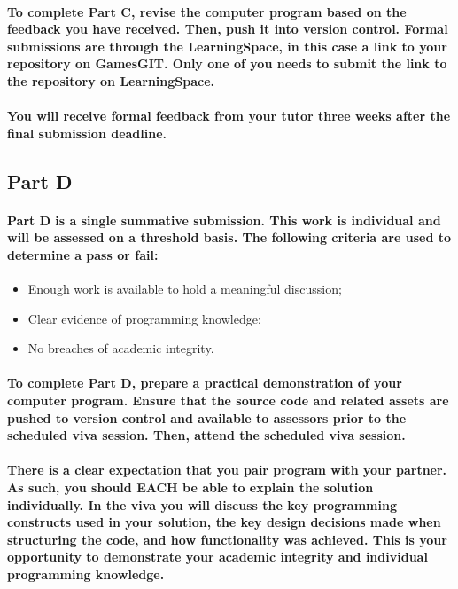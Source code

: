\documentclass{../../fal_assignment}
\begin{document}
\paragraph{To complete Part C, revise the computer program based on the feedback you have received. Then, push it into version control. Formal submissions are through the LearningSpace, in this case a link to your repository on GamesGIT. Only one of you needs to submit the link to the repository on LearningSpace.}

\paragraph{You will receive \textbf{formal feedback} from your \textbf{tutor} three weeks after the final submission deadline.}

\subsection*{Part D}

\paragraph{Part D is a \textbf{single summative submission}. This work is \textbf{individual} and will be assessed on a \textbf{threshold} basis.  The following criteria are used to determine a pass or fail:}

\begin{itemize}
	\item Enough work is available to hold a meaningful discussion;
	\item Clear evidence of programming knowledge;
	\item No breaches of academic integrity.
\end{itemize}

\paragraph{To complete Part D, prepare a practical demonstration of your computer program. Ensure that the source code and related assets are pushed to version control and available to assessors prior to the scheduled viva session. Then, attend the scheduled viva session.}

\paragraph{There is a clear expectation that you pair program with your partner. As such, you should \textbf{EACH} be able to explain the solution individually. In the viva you will discuss the key programming constructs used in your solution, the key design decisions made when structuring the code, and how functionality was achieved. This is your opportunity to demonstrate your academic integrity and individual programming knowledge. }
\end{document}
